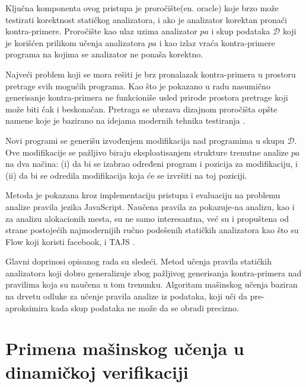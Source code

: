 \documentclass[a4paper]{article}
\theoremstyle{definition}
\begin{document}
{%
Ključna komponenta ovog pristupa je proročište(en. oracle) koje brzo može 
testirati korektnost statičkog analizatora, i ako je analizator korektan 
pronaći kontra-primere. Proročište kao ulaz uzima analizator $pa$ i skup 
podataka $\mathcal{D}$ koji je korišćen prilikom učenja analizatora $pa$ 
i kao izlaz vraća kontra-primere programa na kojima se analizator ne 
ponaša korektno.

Najveći problem koji se mora rešiti je brz pronalazak kontra-primera u prostoru 
pretrage svih mogućih programa. Kao što je pokazano u radu \cite{staticAnalyzer} 
nasumično generisanje kontra-primera ne funkcioniše usled prirode prostora 
pretrage koji može biti čak i beskonačan. Pretraga se ubrzava dizajnom 
proročišta opšte namene koje je bazirano na idejama modernih tehnika testiranja 
\cite{testing}. 

Novi programi se generišu izvođenjem modifikacija nad programima u skupu 
$\mathcal{D}$. Ove modifikacije se pažljivo biraju eksploatisanjem strukture 
trenutne analize $pa$ na dva načina: (i) da bi se izabrao određeni program i 
pozicija za modifikaciju, i (ii) da bi se odredila modifikacija koja će se 
izvršiti na toj poziciji.


Metoda je pokazana kroz implementaciju pristupa i evaluaciju na problemu analize 
pravila jezika JavaScript. Naučena pravila za pokazuje-na analizu, kao i za 
analizu alokacionih mesta, su ne samo interesantna, već su i propuštena od 
strane postojećih najmodernijih ručno podešenih statičkih analizatora kao što 
su Flow \cite{flow} koji koristi facebook, i TAJS \cite{tajs}.

Glavni doprinosi opisanog rada su sledeći. Metod učenja pravila statičkih 
analizatora koji dobro generalizuje zbog pažljivog generisanja kontra-primera 
nad pravilima koja su naučena u tom trenunku. Algoritam mašinskog učenja baziran 
na drvetu odluke za učenje pravila analize iz podataka, koji uči da 
pre-aproksimira kada skup podataka ne može da se obradi precizno. 


\section{Primena mašinskog učenja u dinamičkoj verifikaciji}
\label{sec:dinamcikaPrimena}


}
\end{document}

